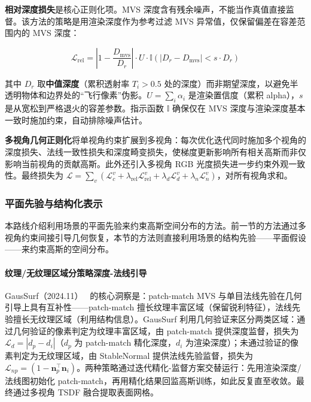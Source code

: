 \textbf{相对深度损失}是核心正则化项。MVS 深度含有残余噪声，不能当作真值直接监督。该方法的策略是用渲染深度作为参考过滤 MVS 异常值，仅保留偏差在容差范围内的 MVS 深度：

\begin{equation}
\mathcal{L}_{\text{rel}} = \left|1 - \frac{D_{\text{mvs}}}{D_r}\right| \cdot U \cdot \mathbb{I}(|D_r - D_{\text{mvs}}| < s \cdot D_r)
\end{equation}

其中 $D_r$ 取\textbf{中值深度}（累积透射率 $T_i > 0.5$ 处的深度）而非期望深度，以避免半透明物体和边界处的“飞行像素”伪影。$U = \sum_i \alpha_i$ 是渲染置信度（累积 alpha），$s$ 是从宽松到严格退火的容差参数。指示函数 $\mathbb{I}$ 确保仅在 MVS 深度与渲染深度基本一致时施加约束，自动排除噪声估计。

\textbf{多视角几何正则化}将单视角约束扩展到多视角：每次优化迭代同时施加多个视角的深度损失、法线一致性损失和深度畸变损失，使梯度更新影响所有相关高斯而非仅影响当前视角的贡献高斯。此外还引入多视角 RGB 光度损失进一步约束外观一致性。最终损失为 $\mathcal{L} = \sum_v (\mathcal{L}_c^v + \lambda_{\text{rel}} \mathcal{L}_{\text{rel}}^v + \lambda_d \mathcal{L}_d^v + \lambda_n \mathcal{L}_n^v)$，对所有视角求和。

\subsubsection{平面先验与结构化表示}

本路线介绍利用场景的平面先验来约束高斯空间分布的方法。前一节的方法通过多视角约束间接引导几何恢复，本节的方法则直接利用场景的结构先验——平面假设——来约束高斯的空间分布。

\paragraph{纹理/无纹理区域分策略深度-法线引导}

GausSurf（2024.11）~\cite{2411_19454} 的核心洞察是：patch-match MVS 与单目法线先验在几何引导上具有互补性——patch-match 擅长纹理丰富区域（保留锐利特征），法线先验擅长无纹理区域（利用结构信息）。GausSurf 利用几何验证来区分两类区域：通过几何验证的像素判定为纹理丰富区域，由 patch-match 提供深度监督，损失为 $\mathcal{L}_d = |d_p - d_i|$（$d_p$ 为 patch-match 精化深度，$d_i$ 为渲染深度）；未通过验证的像素判定为无纹理区域，由 StableNormal 提供法线先验监督，损失为 $\mathcal{L}_{np} = (1 - \mathbf{n}_p^\top \mathbf{n}_i)$。两种策略通过迭代精化-监督方案交替运行：先用渲染深度/法线图初始化 patch-match，再用精化结果回监高斯训练，如此反复直至收敛。最终通过多视角 TSDF 融合提取表面网格。

